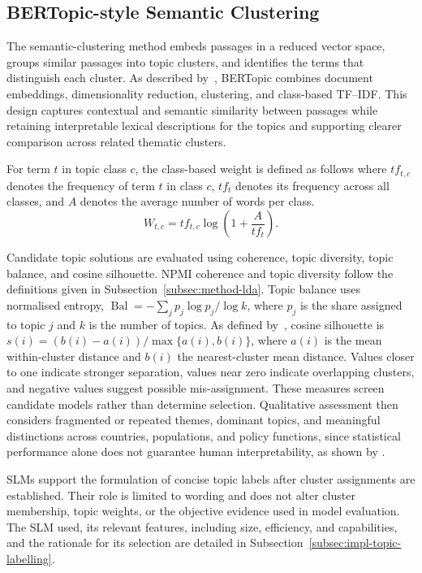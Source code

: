 \subsection{BERTopic-style Semantic Clustering}
\label{subsec:method-bertopic}

The semantic-clustering method embeds passages in a reduced vector space, groups
similar passages into topic clusters, and identifies the terms that distinguish each
cluster. As described by~\cite{grootendorst2022bertopic}, BERTopic combines document
embeddings, dimensionality reduction, clustering, and class-based TF--IDF. This
design captures contextual and semantic similarity between passages while retaining
interpretable lexical descriptions for the topics and supporting clearer comparison
across related thematic clusters.

For term $t$ in topic class $c$, the class-based weight is defined as follows where
$tf_{t,c}$ denotes the frequency of term $t$ in class $c$, $tf_{t}$ denotes its
frequency across all classes, and $A$ denotes the average number of words per class.
\begin{equation}
W_{t,c}
=
tf_{t,c}
\log\left(
1+\frac{A}{tf_t}
\right).
\label{eq:method-ctfidf}
\end{equation}

Candidate topic solutions are evaluated using coherence, topic diversity, topic
balance, and cosine silhouette. NPMI coherence and topic diversity follow the
definitions given in Subsection~\ref{subsec:method-lda}. Topic balance uses
normalised entropy, $\operatorname{Bal}=-\sum_j p_j\log p_j/\log k$, where $p_j$ is
the share assigned to topic $j$ and $k$ is the number of topics. As defined
by~\cite{rousseeuw1987silhouettes}, cosine silhouette is
$s(i)=(b(i)-a(i))/\max\{a(i),b(i)\}$, where $a(i)$ is the mean within-cluster
distance and $b(i)$ the nearest-cluster mean distance. Values closer to one indicate
stronger separation, values near zero indicate overlapping clusters, and negative
values suggest possible mis-assignment. These measures screen candidate models rather
than determine selection. Qualitative assessment then considers fragmented or
repeated themes, dominant topics, and meaningful distinctions across countries,
populations, and policy functions, since statistical performance alone does not
guarantee human interpretability, as shown by \cite{chang2009reading}.

SLMs support the formulation of concise topic labels after cluster assignments are
established. Their role is limited to wording and does not alter cluster membership,
topic weights, or the objective evidence used in model evaluation. The SLM used, its
relevant features, including size, efficiency, and capabilities, and the rationale
for its selection are detailed in Subsection~\ref{subsec:impl-topic-labelling}.


